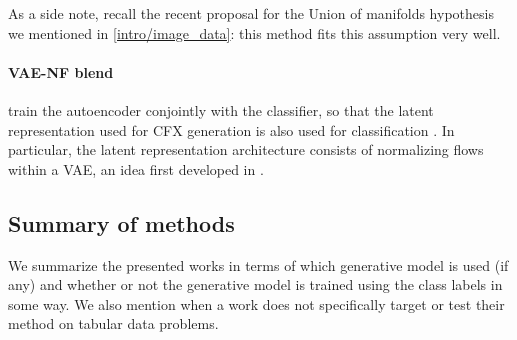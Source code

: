\documentclass[../main.tex]{subfiles}
\begin{document}
As a side note, recall the recent proposal for the Union of manifolds hypothesis \cite{brownUnion2022} we mentioned in
\autoref{intro/image_data}: this method fits this assumption very well.

\paragraph{VAE-NF blend}

\citeauthor{zhangInterpretable2022} train the autoencoder conjointly with the classifier, so that the latent representation used for CFX generation is also used for classification \cite{zhangInterpretable2022}.
In particular, the latent representation architecture consists of normalizing flows within a VAE, an idea first developed in \cite{rezendeVariational2015}.

\subsection{Summary of methods}

We summarize the presented works in terms of which generative model is used (if any) and whether or not the generative model
is trained using the class labels in some way.
We also mention when a work does not specifically target or test their method on tabular data problems.
\end{document}

